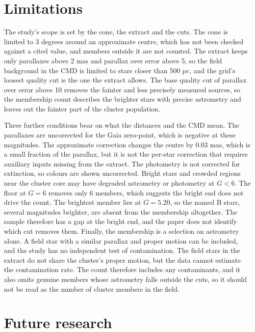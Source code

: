 \documentclass[11pt]{article}
\begin{document}
\section{Limitations}

The study's scope is set by the cone, the extract and the cuts. The cone is limited to 3 degrees around an approximate centre, which has not been checked against a cited value, and members outside it are not counted. The extract keeps only parallaxes above 2 mas and parallax over error above 5, so the field background in the CMD is limited to stars closer than 500 pc, and the grid's loosest quality cut is the one the extract allows. The base quality cut of parallax over error above 10 removes the fainter and less precisely measured sources, so the membership count describes the brighter stars with precise astrometry and leaves out the fainter part of the cluster population.

Three further conditions bear on what the distances and the CMD mean. The parallaxes are uncorrected for the Gaia zero-point, which is negative at these magnitudes. The approximate correction changes the centre by 0.03 mas, which is a small fraction of the parallax, but it is not the per-star correction that requires auxiliary inputs missing from the extract. The photometry is not corrected for extinction, so colours are shown uncorrected. Bright stars and crowded regions near the cluster core may have degraded astrometry or photometry at $G < 6$. The floor at $G = 6$ removes only 6 members, which suggests the bright end does not drive the count. The brightest member lies at $G = 5.20$, so the named B stars, several magnitudes brighter, are absent from the membership altogether. The sample therefore has a gap at the bright end, and the paper does not identify which cut removes them.
Finally, the membership is a selection on astrometry alone. A field star with a similar parallax and proper motion can be included, and the study has no independent test of contamination. The field stars in the extract do not share the cluster's proper motion, but the data cannot estimate the contamination rate. The count therefore includes any contaminants, and it also omits genuine members whose astrometry falls outside the cuts, so it should not be read as the number of cluster members in the field.

\section{Future research}
\end{document}
